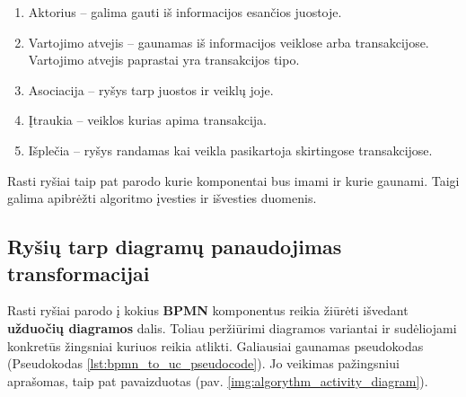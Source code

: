 \documentclass{VUMIFInfBakalaurinis}
\begin{document}
\begin{enumerate}
	\item Aktorius – galima gauti iš informacijos esančios juostoje. 
	\item Vartojimo atvejis – gaunamas iš informacijos veiklose arba transakcijose. Vartojimo atvejis paprastai yra transakcijos tipo.
	\item Asociacija – ryšys tarp juostos ir veiklų joje.
	\item Įtraukia – veiklos kurias apima transakcija.
	\item Išplečia – ryšys randamas kai veikla pasikartoja skirtingose transakcijose.
\end{enumerate} 

Rasti ryšiai taip pat parodo kurie komponentai bus imami ir kurie gaunami. Taigi galima apibrėžti algoritmo įvesties ir išvesties duomenis.


\subsection{Ryšių tarp diagramų panaudojimas transformacijai}

Rasti ryšiai parodo į kokius \textbf{BPMN} komponentus reikia žiūrėti išvedant \textbf{užduočių diagramos} dalis. Toliau peržiūrimi diagramos variantai ir sudėliojami konkretūs žingsniai kuriuos reikia atlikti. Galiausiai gaunamas pseudokodas (Pseudokodas \ref{lst:bpmn_to_uc_pseudocode}). Jo veikimas pažingsniui aprašomas, taip pat pavaizduotas (pav. \ref{img:algorythm_activity_diagram}).
\end{document}
